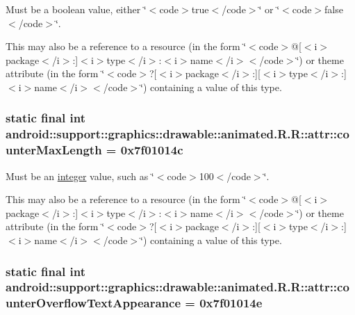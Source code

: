 Must be a boolean value, either \char`\"{}$<$code$>$true$<$/code$>$\char`\"{} or \char`\"{}$<$code$>$false$<$/code$>$\char`\"{}. 

This may also be a reference to a resource (in the form \char`\"{}$<$code$>$@\mbox{[}$<$i$>$package$<$/i$>$:\mbox{]}$<$i$>$type$<$/i$>$:$<$i$>$name$<$/i$>$$<$/code$>$\char`\"{}) or theme attribute (in the form \char`\"{}$<$code$>$?\mbox{[}$<$i$>$package$<$/i$>$:\mbox{]}\mbox{[}$<$i$>$type$<$/i$>$:\mbox{]}$<$i$>$name$<$/i$>$$<$/code$>$\char`\"{}) containing a value of this type. \hypertarget{classandroid_1_1support_1_1graphics_1_1drawable_1_1animated_1_1_r_1_1attr_49371031a831f0a9d1182c734bb0e9c8}{
\subsubsection[{counterMaxLength}]{\setlength{\rightskip}{0pt plus 5cm}static final int android::support::graphics::drawable::animated.R.R::attr::counterMaxLength = 0x7f01014c}}
\label{classandroid_1_1support_1_1graphics_1_1drawable_1_1animated_1_1_r_1_1attr_49371031a831f0a9d1182c734bb0e9c8}


Must be an \hyperlink{classandroid_1_1support_1_1graphics_1_1drawable_1_1animated_1_1_r_1_1integer}{integer} value, such as \char`\"{}$<$code$>$100$<$/code$>$\char`\"{}. 

This may also be a reference to a resource (in the form \char`\"{}$<$code$>$@\mbox{[}$<$i$>$package$<$/i$>$:\mbox{]}$<$i$>$type$<$/i$>$:$<$i$>$name$<$/i$>$$<$/code$>$\char`\"{}) or theme attribute (in the form \char`\"{}$<$code$>$?\mbox{[}$<$i$>$package$<$/i$>$:\mbox{]}\mbox{[}$<$i$>$type$<$/i$>$:\mbox{]}$<$i$>$name$<$/i$>$$<$/code$>$\char`\"{}) containing a value of this type. \hypertarget{classandroid_1_1support_1_1graphics_1_1drawable_1_1animated_1_1_r_1_1attr_4ee2bbdc55fb62cd8d3ca134916a7f22}{
\subsubsection[{counterOverflowTextAppearance}]{\setlength{\rightskip}{0pt plus 5cm}static final int android::support::graphics::drawable::animated.R.R::attr::counterOverflowTextAppearance = 0x7f01014e}}
\label{classandroid_1_1support_1_1graphics_1_1drawable_1_1animated_1_1_r_1_1attr_4ee2bbdc55fb62cd8d3ca134916a7f22}



